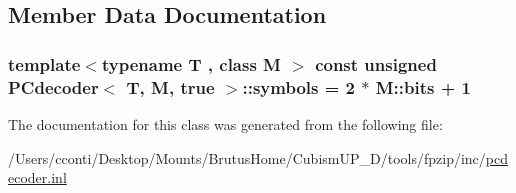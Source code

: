 \subsection{Member Data Documentation}
\hypertarget{class_p_cdecoder_3_01_t_00_01_m_00_01true_01_4_a81e2a7f084f2b56d559ff9f29cffcc87}{}
\subsubsection[{symbols}]{\setlength{\rightskip}{0pt plus 5cm}template$<$typename T , class M $>$ const unsigned {\bf P\+Cdecoder}$<$ T, M, true $>$\+::symbols = 2 $\ast$ M\+::bits + 1\hspace{0.3cm}{\ttfamily [static]}}\label{class_p_cdecoder_3_01_t_00_01_m_00_01true_01_4_a81e2a7f084f2b56d559ff9f29cffcc87}


The documentation for this class was generated from the following file\+:\begin{DoxyCompactItemize}
\item 
/\+Users/cconti/\+Desktop/\+Mounts/\+Brutus\+Home/\+Cubism\+U\+P\+\_\+D/tools/fpzip/inc/\hyperlink{pcdecoder_8inl}{pcdecoder.\+inl}\end{DoxyCompactItemize}
